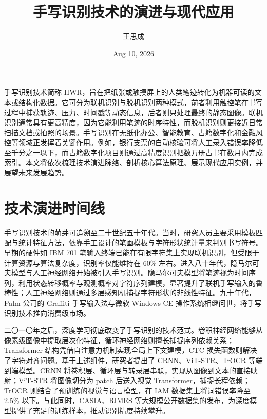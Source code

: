 \title{手写识别技术的演进与现代应用}
\author{王思成}
\date{Aug 10, 2026}
\maketitle
手写识别技术简称 HWR，旨在把纸张或触摸屏上的人类笔迹转化为机器可读的文本或结构化数据。它可分为联机识别与脱机识别两种模式，前者利用触控笔在书写过程中捕获轨迹、压力、时间戳等动态信息，后者则只处理最终的静态图像。联机识别通常具有更高精度，因为它能利用笔迹的时序特性，而脱机识别则更接近日常扫描文档或拍照的场景。手写识别在无纸化办公、智能教育、古籍数字化和金融风控等领域正发挥着关键作用。例如，银行支票的自动核验可将人工录入错误率降低至千分之一以下，而古籍数字化项目则通过高精度识别把数万册古书在数月内完成索引。本文将依次梳理技术演进脉络、剖析核心算法原理、展示现代应用实例，并展望未来发展趋势。\par
\chapter{技术演进时间线}
手写识别技术的萌芽可追溯至二十世纪五十年代。当时，研究人员主要采用模板匹配与统计特征方法，依靠手工设计的笔画模板与字符形状统计量来判别书写符号。早期的硬件如 IBM 701 笔输入终端已能在有限字符集上实现联机识别，但受限于计算资源与算法复杂度，识别率仅能维持在 60\%{} 左右。进入八十年代，隐马尔可夫模型与人工神经网络开始被引入手写识别。隐马尔可夫模型将笔迹视为时间序列，利用状态转移概率与观测概率对字符序列建模，显著提升了联机手写输入的鲁棒性；人工神经网络则通过多层感知机捕捉字符形状的非线性特征。九十年代，Palm 公司的 Graffiti 手写输入法与微软 Windows CE 操作系统相继问世，将手写识别技术推向消费级市场。\par
二〇一〇年之后，深度学习彻底改变了手写识别的技术范式。卷积神经网络能够从像素级图像中提取层次化特征，循环神经网络则擅长捕捉序列依赖关系；Transformer 结构凭借自注意力机制实现全局上下文建模，CTC 损失函数则解决了字符对齐问题。基于上述组件，研究者提出了 CRNN、ViT-STR、TrOCR 等端到端模型。CRNN 将卷积层、循环层与转录层串联，实现从图像到文本的直接映射；ViT-STR 将图像切分为 patch 后送入视觉 Transformer，捕捉长程依赖；TrOCR 则结合了预训练的视觉与语言模型，在 IAM 数据集上将词错误率降至 2.5\%{} 以下。与此同时，CASIA、RIMES 等大规模公开数据集的发布，为深度模型提供了充足的训练样本，推动识别精度持续攀升。\par
